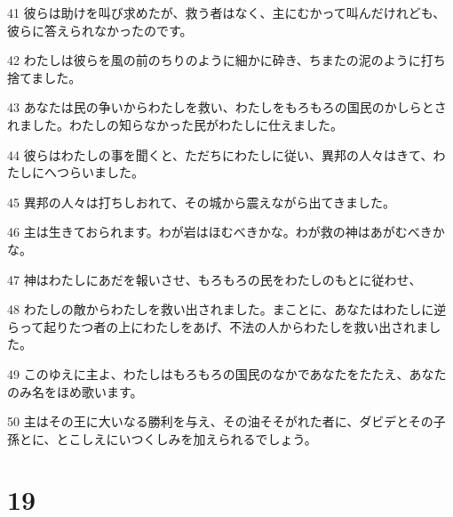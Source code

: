 \par 41 彼らは助けを叫び求めたが、救う者はなく、主にむかって叫んだけれども、彼らに答えられなかったのです。
\par 42 わたしは彼らを風の前のちりのように細かに砕き、ちまたの泥のように打ち捨てました。
\par 43 あなたは民の争いからわたしを救い、わたしをもろもろの国民のかしらとされました。わたしの知らなかった民がわたしに仕えました。
\par 44 彼らはわたしの事を聞くと、ただちにわたしに従い、異邦の人々はきて、わたしにへつらいました。
\par 45 異邦の人々は打ちしおれて、その城から震えながら出てきました。
\par 46 主は生きておられます。わが岩はほむべきかな。わが救の神はあがむべきかな。
\par 47 神はわたしにあだを報いさせ、もろもろの民をわたしのもとに従わせ、
\par 48 わたしの敵からわたしを救い出されました。まことに、あなたはわたしに逆らって起りたつ者の上にわたしをあげ、不法の人からわたしを救い出されました。
\par 49 このゆえに主よ、わたしはもろもろの国民のなかであなたをたたえ、あなたのみ名をほめ歌います。
\par 50 主はその王に大いなる勝利を与え、その油そそがれた者に、ダビデとその子孫とに、とこしえにいつくしみを加えられるでしょう。

\chapter{19}

